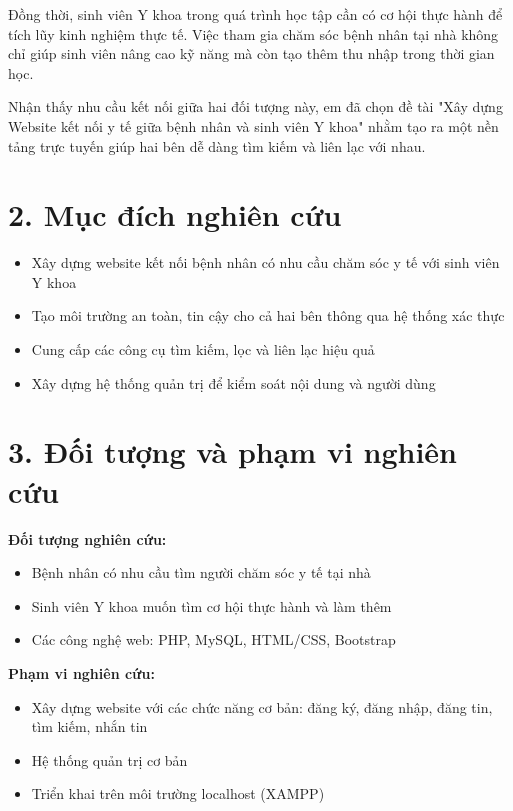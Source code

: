 \documentclass[a4paper,12pt]{report}
\begin{document}
Đồng thời, sinh viên Y khoa trong quá trình học tập cần có cơ hội thực hành để tích lũy kinh nghiệm thực tế. Việc tham gia chăm sóc bệnh nhân tại nhà không chỉ giúp sinh viên nâng cao kỹ năng mà còn tạo thêm thu nhập trong thời gian học.

Nhận thấy nhu cầu kết nối giữa hai đối tượng này, em đã chọn đề tài "Xây dựng Website kết nối y tế giữa bệnh nhân và sinh viên Y khoa" nhằm tạo ra một nền tảng trực tuyến giúp hai bên dễ dàng tìm kiếm và liên lạc với nhau.

\section*{2. Mục đích nghiên cứu}

\begin{itemize}
    \item Xây dựng website kết nối bệnh nhân có nhu cầu chăm sóc y tế với sinh viên Y khoa
    \item Tạo môi trường an toàn, tin cậy cho cả hai bên thông qua hệ thống xác thực
    \item Cung cấp các công cụ tìm kiếm, lọc và liên lạc hiệu quả
    \item Xây dựng hệ thống quản trị để kiểm soát nội dung và người dùng
\end{itemize}

\section*{3. Đối tượng và phạm vi nghiên cứu}

\textbf{Đối tượng nghiên cứu:}
\begin{itemize}
    \item Bệnh nhân có nhu cầu tìm người chăm sóc y tế tại nhà
    \item Sinh viên Y khoa muốn tìm cơ hội thực hành và làm thêm
    \item Các công nghệ web: PHP, MySQL, HTML/CSS, Bootstrap
\end{itemize}

\textbf{Phạm vi nghiên cứu:}
\begin{itemize}
    \item Xây dựng website với các chức năng cơ bản: đăng ký, đăng nhập, đăng tin, tìm kiếm, nhắn tin
    \item Hệ thống quản trị cơ bản
    \item Triển khai trên môi trường localhost (XAMPP)
\end{itemize}
\end{document}
